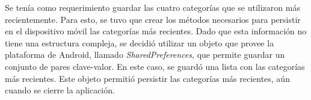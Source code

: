 \begin{itemize}
Se tenía como requerimiento guardar las cuatro categorías que se utilizaron más recientemente. Para esto, se tuvo que crear los métodos necesarios para persistir en el dispositivo móvil las categorías más recientes. Dado que esta información no tiene una estructura compleja, se decidió utilizar un objeto que provee la plataforma de Android, llamado \textit{SharedPreferences}, que permite guardar un conjunto de pares clave-valor. En este caso, se guardó una lista con las categorías más recientes. Este objeto permitió persistir las categorías más recientes, aún cuando se cierre la aplicación.

\end{itemize}

%
%
%
%
%
%
